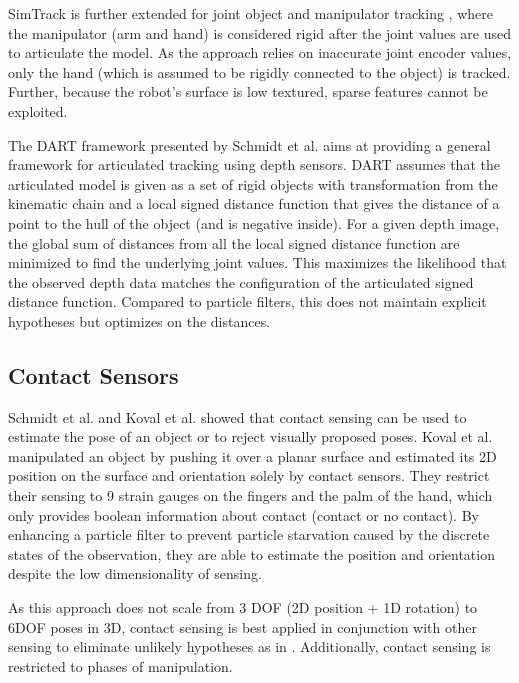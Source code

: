 SimTrack is further extended for joint object and manipulator tracking \cite{Pauwels2014b}, where the manipulator (arm and hand) is considered rigid after the joint values are used to articulate the model. As the approach relies on inaccurate joint encoder values, only the hand (which is assumed to be rigidly connected to the object) is tracked. Further, because the robot's surface is low textured, sparse features cannot be exploited.

The DART framework presented by Schmidt et al. \cite{Schmidt2015, Schmidt2015b} aims at providing a general framework for articulated tracking using depth sensors. DART assumes that the articulated model is given as a set of rigid objects with transformation from the kinematic chain and a local signed distance function that gives the distance of a point to the hull of the object (and is negative inside). For a given depth image, the global sum of distances from all the local signed distance function are minimized to find the underlying joint values. This maximizes the likelihood that the observed depth data matches the configuration of the articulated signed distance function. Compared to particle filters, this does not maintain explicit hypotheses but optimizes on the distances.

\subsection{Contact Sensors}

Schmidt et al. \cite{Schmidt2015b} and Koval et al. \cite{Koval2015} showed that contact sensing can be used to estimate the pose of an object or to reject visually proposed poses.
Koval et al. \cite{Koval2015} manipulated an object by pushing it over a planar surface and estimated its 2D position on the surface and orientation solely by contact sensors. They restrict their sensing to 9 strain gauges on the fingers and the palm of the hand, which only provides boolean information about contact (contact or no contact). By enhancing a particle filter to prevent particle starvation caused by the discrete states of the observation, they are able to estimate the position and orientation despite the low dimensionality of sensing.

As this approach does not scale from 3 DOF (2D position + 1D rotation) to 6DOF poses in 3D, contact sensing is best applied in conjunction with other sensing to eliminate unlikely hypotheses as in \cite{Schmidt2015b}. Additionally, contact sensing is restricted to phases of manipulation.

